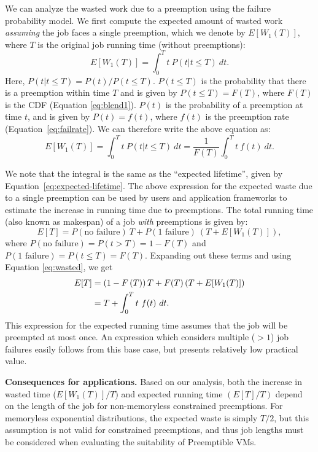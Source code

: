 \documentclass[compsoc]{IEEEtran}
\begin{document}
We can analyze the wasted work due to a preemption using the failure probability model.
We first compute the expected amount of wasted work \emph{assuming} the job faces a single preemption, which we denote by $E[W_1(T)]$, where $T$ is the original job running time (without preemptions):
\begin{equation}
E[W_1(T)] = \int_0^{T} t~P(t | t \leq T)~dt.
\end{equation}
Here, $P(t|t\leq T) = P(t) / P(t \leq T)$. $P(t\leq T)$ is the probability that there is a preemption within time $T$ and is given by $P(t \leq T) = F(T)$, where $F(T)$ is the CDF (Equation \ref{eq:blend1}). 
$P(t)$ is the probability of a preemption at time $t$, and is given by $P(t) = f(t)$, where $f(t)$ is the preemption rate (Equation~\ref{eq:failrate}).
We can therefore write the above equation as:
\begin{equation}
  E[W_1(T)] = \int_0^{T} t~P(t | t \leq T)~dt = \frac{1}{F(T)}  \int_0^{T} t~f(t)~dt.
    \label{eq:wasted}
\end{equation}

We note that the integral is the same as the ``expected lifetime'', given by Equation~\ref{eq:expected-lifetime}.
The above expression for the expected waste due to a single preemption can be used by users and application frameworks to estimate the increase in running time due to preemptions. 
The total running time (also known as makespan) of a job \emph{with} preemptions is given by:
\begin{equation}
  \label{eq:tot-run-time}
  E[T] = P(\text{no failure})~T + P(\text{1 failure})~\left(T + E[W_1(T)]\right),
\end{equation}
where $P(\text{no failure}) = P(t > T) =  1- F(T)$ and $P(\text{1 failure}) = P(t \leq T) = F(T)$.
Expanding out these terms and using Equation \ref{eq:wasted}, we get
\begin{align}
  \label{eq:tot-run-time-2}
  E[T] &= \left(1-F\left(T\right)\right)T + F(T)\left(T + E[W_1(T)]\right) \notag \\
  &= T + \int_0^{T} t~f(t)~dt.         
\end{align}
This expression for the expected running time assumes that the job will be preempted at most once.
An expression which considers multiple ($>1$) job failures easily follows from this base case, but presents relatively low practical value.



\noindent \textbf{Consequences for applications.}
Based on our analysis, both the increase in wasted time ($E[W_1(T)]/T$) and expected running time $(E[T]/T)$ depend on the length of the job for non-memoryless constrained preemptions. 
For memoryless exponential distributions, the expected waste is simply $T/2$, but this assumption is not valid for constrained preemptions, and thus job lengths must be considered when evaluating the suitability of Preemptible VMs. 
\end{document}

